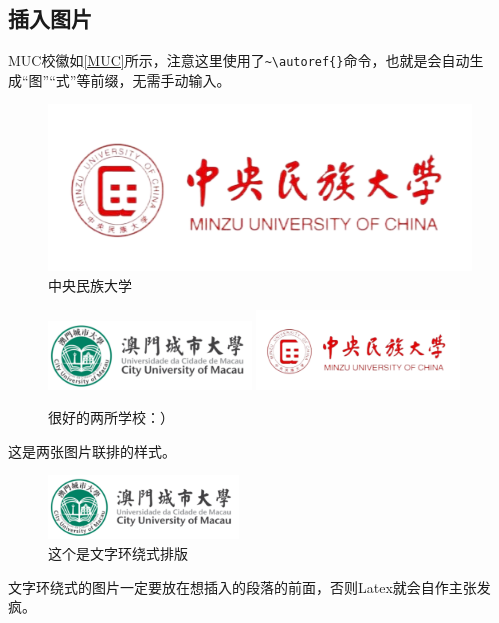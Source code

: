\documentclass[12pt,hyperref,a4paper,UTF8]{ctexart}
\begin{document}
\subsection{插入图片}
MUC校徽如\autoref{MUC}所示，注意这里使用了\verb|~\autoref{}|命令，也就是会自动生成“图”“式”等前缀，无需手动输入。

\begin{figure}[!htbp]
    \centering
    \includegraphics[width =.5\textwidth]{figures/muc.png}
    \caption{中央民族大学}
    \label{MUC}
\end{figure}

\begin{figure}[htbp]
\centering
{}%
  {\includegraphics[width=0.48\textwidth]{figures/CityU.png}}\hfill
{}%
  {\includegraphics[width=0.48\textwidth]{figures/muc.png}}
\caption{很好的两所学校：）}
\label{fig:ds1}
\end{figure}

这是两张图片联排的样式。

\begin{figure}%
\centering
\includegraphics[width=0.45\textwidth]{figures/CityU.png}
\caption{这个是文字环绕式排版} \label{fig1}
\end{figure}
文字环绕式的图片一定要放在想插入的段落的前面，否则Latex就会自作主张发疯。
\end{document}
